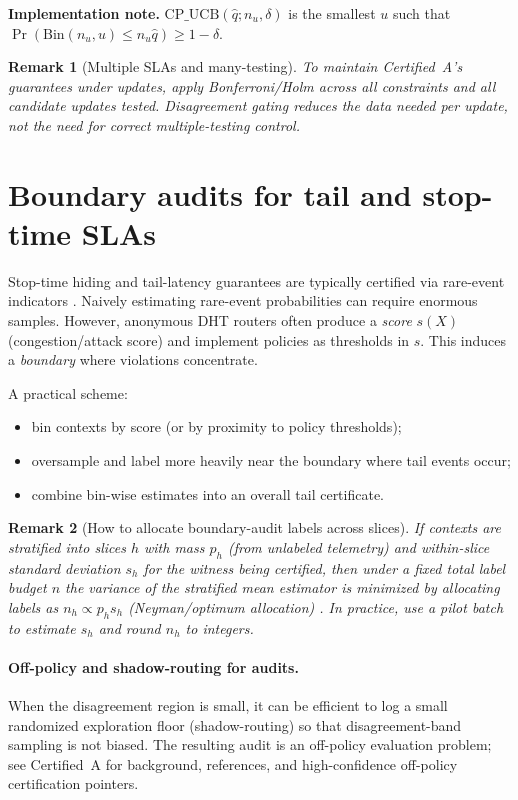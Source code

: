 \documentclass[11pt]{article}
\newtheorem{remark}{Remark}
\begin{document}
\noindent\textbf{Implementation note.} $\mathrm{CP\_UCB}(\widehat{q};n_u,\delta)$ is the smallest $u$ such that $\Pr(\mathrm{Bin}(n_u,u)\le n_u\widehat{q})\ge 1-\delta$.

\begin{remark}[Multiple SLAs and many-testing]
To maintain Certified~A's guarantees under updates, apply Bonferroni/Holm across all constraints and all candidate updates tested.
Disagreement gating reduces the \emph{data needed per update}, not the need for correct multiple-testing control.
\end{remark}

\section{Boundary audits for tail and stop-time SLAs}
Stop-time hiding and tail-latency guarantees are typically certified via rare-event indicators \cite{series:stoptime,series:scheduling}.
Naively estimating rare-event probabilities can require enormous samples.
However, anonymous DHT routers often produce a \emph{score} $s(X)$ (congestion/attack score) and implement policies as thresholds in $s$.
This induces a \emph{boundary} where violations concentrate.

A practical scheme:
\begin{itemize}
  \item bin contexts by score (or by proximity to policy thresholds);
  \item oversample and label more heavily near the boundary where tail events occur;
  \item combine bin-wise estimates into an overall tail certificate.
\end{itemize}

\begin{remark}[How to allocate boundary-audit labels across slices]
If contexts are stratified into slices $h$ with mass $p_h$ (from unlabeled telemetry) and within-slice standard deviation $s_h$ for the witness being certified, then under a fixed total label budget $n$ the variance of the stratified mean estimator is minimized by allocating labels as
$n_h \propto p_h s_h$ (Neyman/optimum allocation) \cite{neyman1934,cochran1977}.
In practice, use a pilot batch to estimate $s_h$ and round $n_h$ to integers.
\end{remark}



\paragraph{Off-policy and shadow-routing for audits.}
When the disagreement region is small, it can be efficient to log a small randomized exploration floor (shadow-routing) so that disagreement-band sampling is not biased.
The resulting audit is an off-policy evaluation problem; see Certified~A for background, references, and high-confidence off-policy certification pointers.
\end{document}
